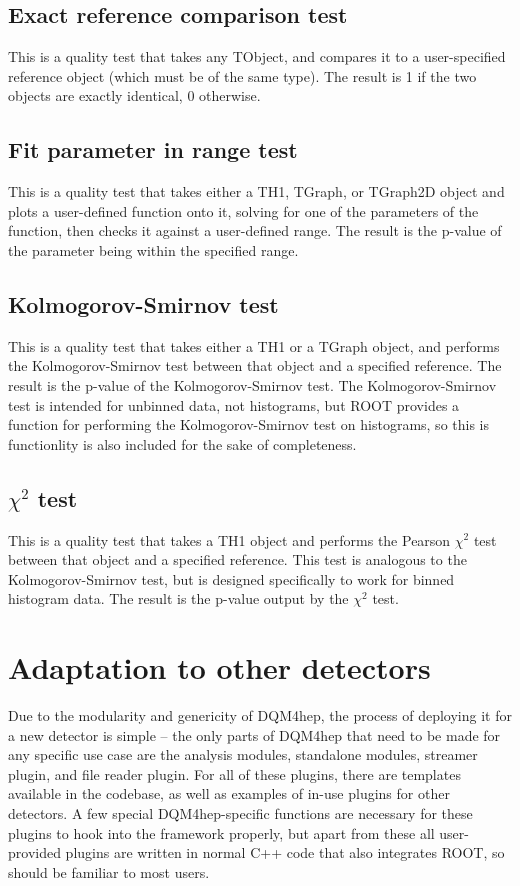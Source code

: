 \subsection{Exact reference comparison test}
This is a quality test that takes any TObject, and compares it to a user-specified reference object (which must be of the same type). The result is 1 if the two objects are exactly identical, 0 otherwise. 

\subsection{Fit parameter in range test}
This is a quality test that takes either a TH1, TGraph, or TGraph2D object and plots a user-defined function onto it, solving for one of the parameters of the function, then checks it against a user-defined range. The result is the p-value of the parameter being within the specified range.

\subsection{Kolmogorov-Smirnov test}
This is a quality test that takes either a TH1 or a TGraph object, and performs the Kolmogorov-Smirnov test between that object and a specified reference. The result is the p-value of the Kolmogorov-Smirnov test. The Kolmogorov-Smirnov test is intended for unbinned data, not histograms, but ROOT provides a function for performing the Kolmogorov-Smirnov test on histograms, so this is functionlity is also included for the sake of completeness.

\subsection{$\chi^2$ test}
This is a quality test that takes a TH1 object and performs the Pearson $\chi^2$ test between that object and a specified reference. This test is analogous to the Kolmogorov-Smirnov test, but is designed specifically to work for binned histogram data. The result is the p-value output by the $\chi^2$ test. 


\section{Adaptation to other detectors}
Due to the modularity and genericity of DQM4hep, the process of deploying it for a new detector is simple -- the only parts of DQM4hep that need to be made for any specific use case are the analysis modules, standalone modules, streamer plugin, and file reader plugin. For all of these plugins, there are templates available in the codebase, as well as examples of in-use plugins for other detectors. A few special DQM4hep-specific functions are necessary for these plugins to hook into the framework properly, but apart from these all user-provided plugins are written in normal C++ code that also integrates ROOT, so should be familiar to most users.

